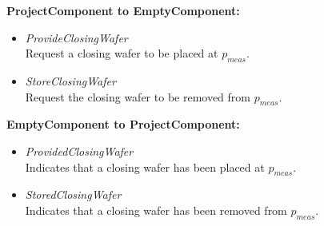 \textbf{ProjectComponent to EmptyComponent:}
	\begin{itemize}
	\item  \textit{ProvideClosingWafer}\\
	Request a closing wafer to be placed at $p_\mathit{meas}$.
	\item  \textit{StoreClosingWafer}\\
	Request the closing wafer to be removed from $p_\mathit{meas}$.
	\end{itemize}
\textbf{EmptyComponent to ProjectComponent:}
	\begin{itemize}
	\item  \textit{ProvidedClosingWafer}\\
	Indicates that a closing wafer has been placed at $p_\mathit{meas}$.
	\item  \textit{StoredClosingWafer}\\
	Indicates that a closing wafer has been removed from $p_\mathit{meas}$.
	\end{itemize}